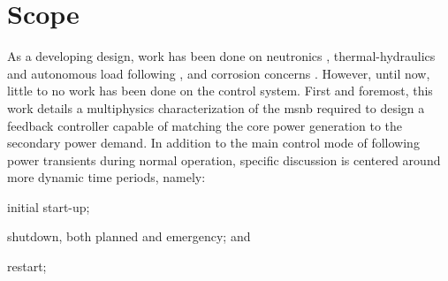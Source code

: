 \section{Scope}
As a developing design, work has been done on neutronics \cite{PetersonMS}, thermal-hydraulics and autonomous load following \cite{CarterPHD}, and corrosion concerns \cite{RoperPHD}. However, until now, little to no work has been done on the control system. First and foremost, this work details a multiphysics characterization of the \acs{msnb} required to design a feedback controller capable of matching the core power generation to the secondary power demand. In addition to the main control mode of following power transients during normal operation, specific discussion is centered around more dynamic time periods, namely: 
\begin{enumerate*}
    \item initial start-up;
    \item shutdown, both planned and emergency; and
    \item restart;
\end{enumerate*}

\begin{comment}
\section{Outline}
This report will begin by discussing the field of process control engineering, specifically the control methods which are most useful in the design of a controller for the \acs{msnb}, and the challenges inherent to a controlling a nuclear chain reaction, both in normal operational modes and special cases. The reactor will then be characterized, using a combination of stochastic neutron transport code to define the reactivity curve of the control drums and finite element process simulation to understand the reactivity feedback effects intrinsic to the design. The resulting model of the reactor will then be used to design and tune the controller, which will then be tested against the reactor's autonomous response to load demand changes. Finally, after the results of the simulation are analyzed, the limitations of this method, as well as future work that will be required to implement a \acl{msnb} will be discussed.   
\end{comment}